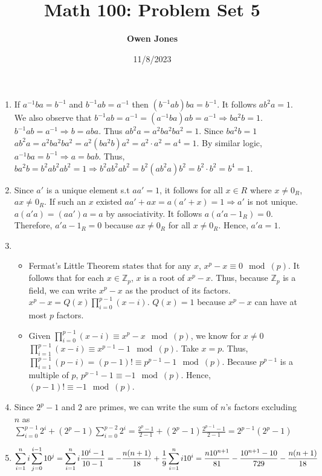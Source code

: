 \documentclass[10pt]{article}
\title{\bf Math 100: Problem Set 5}
\date{11/8/2023}
\author{\bf Owen Jones}
\begin{document}
\maketitle
\begin{enumerate}[label= (Q-\arabic*)]
\item If $a^{-1}ba=b^{-1}$ and $b^{-1}ab=a^{-1}$ then $(b^{-1}ab)ba=b^{-1}$. 
It follows $ab^2a=1$. 
We also observe that $b^{-1}ab=a^{-1}=(a^{-1}ba)ab=a^{-1}\Rightarrow ba^2b=1$.
$b^{-1}ab=a^{-1}\Rightarrow b=aba$. Thus $ab^2a=a^2ba^2ba^2=1$. 
Since $ba^2b=1$ $ab^2a=a^2ba^2ba^2=a^2(ba^2b)a^2=a^2\cdot a^2=a^4=1$.
By similar logic, $a^{-1}ba=b^{-1}\Rightarrow a=bab$. 
Thus, $ba^2b=b^2ab^2ab^2=1\Rightarrow b^2ab^2ab^2=b^2(ab^2a)b^2=b^2\cdot b^2=b^4=1$.
\item Since $a'$ is a unique element s.t $aa'=1$, it follows for all $x\in R$ where $x\neq 0_R$, $ax\neq0_R$. 
If such an $x$ existed $aa'+ax=a(a'+x)=1\Rightarrow a'$ is not unique.
$a(a'a)=(aa')a=a$ by associativity. 
It follows $a(a'a-1_R)=0$. 
Therefore, $a'a-1_R=0$ because $ax\neq0_R$ for all $x\neq 0_R$. 
Hence, $a'a=1$.
\item \begin{itemize}
    \item Fermat's Little Theorem states that for any $x$, $x^{p}-x\equiv0\mod(p)$. 
    It follows that for each $x\in\mathbb{Z}_p$, $x$ is a root of $x^p-x$. 
    Thus, because $\mathbb{Z}_p$ is a field, we can write $x^p-x$ as the product of its factors. $\displaystyle x^p-x=Q(x)\prod_{i=0}^{p-1}(x-i)$.
    $Q(x)=1$ because $x^p-x$ can have at most $p$ factors.
    \item Given $\displaystyle \prod_{i=0}^{p-1}(x-i)\equiv x^p-x\mod(p)$, we know for $x\neq0$ $\displaystyle \prod_{i=1}^{p-1}(x-i)\equiv x^{p-1}-1\mod(p)$. 
    Take $x=p$. Thus, $\prod_{i=1}^{p-1}(p-i)=(p-1)!\equiv p^{p-1}-1\mod(p)$. Because $p^{p-1}$ is a multiple of $p$, $p^{p-1}-1\equiv-1\mod(p)$. 
    Hence, $(p-1)!\equiv-1\mod(p)$.
\end{itemize}
\item Since $2^p-1$ and $2$ are primes, we can write the sum of $n$'s factors excluding $n$ as $\displaystyle \sum_{i=0}^{p-1}2^i+(2^p-1)\sum_{i=0}^{p-2}2^i=\frac{2^p-1}{2-1}+(2^p-1)\frac{2^{p-1}-1}{2-1}=2^{p-1}(2^p-1)$
\item $\displaystyle\sum_{i=1}^{n}i\sum_{j=0}^{i-1}10^j=\sum_{i=1}^{n}i\frac{10^i-1}{10-1}=-\frac{n(n+1)}{18}+\frac{1}{9}\sum_{i=1}^{n}i10^i\\
=\frac{n10^{n+1}}{81}-\frac{10^{n+1}-10}{729}-\frac{n(n+1)}{18}$

\end{enumerate}
\end{document}
